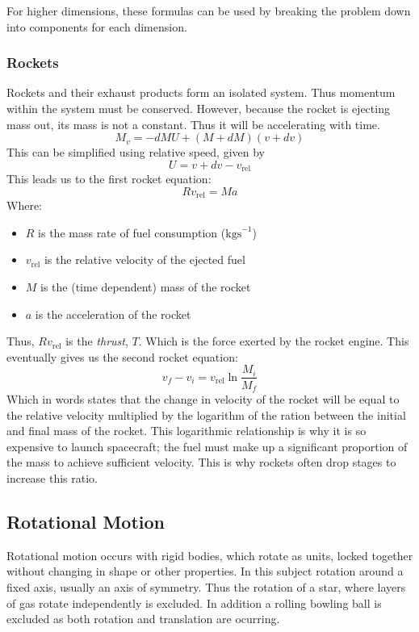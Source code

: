 \documentclass[12pt]{report}
\begin{document}
\begin{flushleft}
\bigskip
For higher dimensions, these formulas can be used by breaking the problem
down into components for each dimension.

\subsubsection*{Rockets}
Rockets and their exhaust products form an isolated system. Thus momentum
within the system must be conserved. However, because the rocket is ejecting
mass out, its mass is not a constant. Thus it will be accelerating with time.
\[M_v = -dMU + (M + dM)(v + dv)\]
This can be simplified using relative speed, given by
\[U = v + dv - v_\mathrm{rel}\]
This leads us to the first rocket equation:
\[Rv_\mathrm{rel} = Ma\]
Where:
\begin{itemize}
    \item \(R\) is the mass rate of fuel consumption (\(\mathrm{kgs}^{-1}\))
    \item \(v_\mathrm{rel}\) is the relative velocity of the ejected fuel
    \item \(M\) is the (time dependent) mass of the rocket
    \item \(a\) is the acceleration of the rocket
\end{itemize}
Thus, \(Rv_\mathrm{rel}\) is the \textit{thrust}, \(T\). Which is the force 
exerted by the rocket engine. This eventually gives us the second rocket 
equation:
\[v_f - v_i = v_\mathrm{rel}\ln\frac{M_i}{M_f}\]
Which in words states that the change in velocity of the rocket will be equal
to the relative velocity multiplied by the logarithm of the ration between the
initial and final mass of the rocket. This logarithmic relationship is why
it is so expensive to launch spacecraft; the fuel must make up a significant
proportion of the mass to achieve sufficient velocity. This is why rockets
often drop stages to increase this ratio.

\subsection*{Rotational Motion}
Rotational motion occurs with rigid bodies, which rotate as units, locked 
together without changing in shape or other properties. In this subject 
rotation around a fixed axis, usually an axis of symmetry. Thus the rotation
of a star, where layers of gas rotate independently is excluded. In addition 
a rolling bowling ball is excluded as both rotation and translation are 
ocurring.


\end{flushleft}
\end{document}
